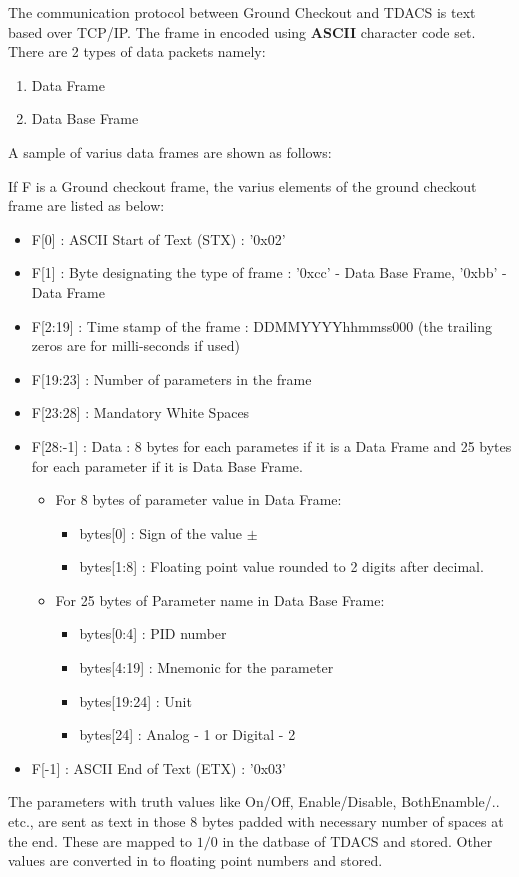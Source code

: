 \par The communication protocol between Ground Checkout and TDACS is text based
over TCP/IP. The frame in encoded using \textbf{ASCII} character code set.
There are 2 types of data packets namely:

\begin{enumerate}
	\item Data Frame
	\item Data Base Frame
\end{enumerate}
A sample of varius data frames are shown as follows:

\newpage
If F is a Ground checkout frame, the varius elements of the ground checkout
frame are listed as below:


\begin{itemize}
	\item F[0] : ASCII Start of Text (STX) : '0x02'
	\item F[1] : Byte designating the type of frame : '0xcc' - Data Base Frame,
		'0xbb' - Data Frame
	\item F[2:19] : Time stamp of the frame :  DDMMYYYYhhmmss000 (the trailing
		zeros are for milli-seconds if used)
	\item F[19:23] : Number of parameters in the frame
	\item F[23:28] : Mandatory White Spaces
	\item F[28:-1] : Data : 8 bytes for each parametes if it is a Data Frame
		and 25 bytes for each parameter if it is Data Base Frame.
		\begin{itemize}
			\item For 8 bytes of parameter value in Data Frame:
				\begin{itemize}
					\item bytes[0] : Sign of the value $\pm$
					\item bytes[1:8] : Floating point value rounded to 2
						digits after decimal.
				\end{itemize}
			\item For 25 bytes of Parameter name in Data Base Frame:
				\begin{itemize}
					\item bytes[0:4] : PID number
					\item bytes[4:19] : Mnemonic for the parameter
					\item bytes[19:24] : Unit
					\item bytes[24] : Analog - 1 or Digital - 2
				\end{itemize}
		\end{itemize}
	\item F[-1] : ASCII End of Text (ETX) : '0x03'
\end{itemize}
\bigskip
The parameters with truth values like On/Off, Enable/Disable, BothEnamble/..
etc., are sent as text in those 8 bytes padded with necessary number of spaces
at the end. These are mapped to $1/0$ in the datbase of TDACS and stored. Other
values are converted in to floating point numbers and stored.
